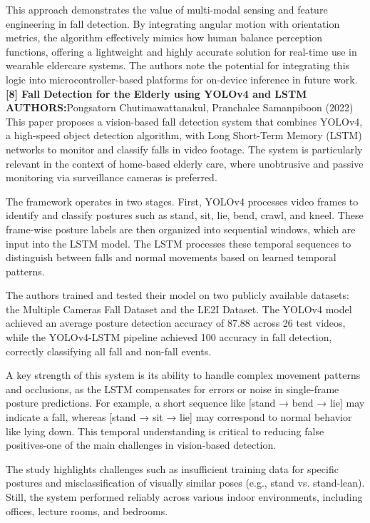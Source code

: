 \documentclass[a4paper, 12pt]{report}
\begin{document}
This approach demonstrates the value of multi-modal sensing and feature engineering in fall detection. By integrating angular motion with orientation metrics, the algorithm effectively mimics how human balance perception functions, offering a lightweight and highly accurate solution for real-time use in wearable eldercare systems. The authors note the potential for integrating this logic into microcontroller-based platforms for on-device inference in future work.\\
\noindent\textbf{[8] Fall Detection for the Elderly using YOLOv4 and LSTM}\\
\textbf{AUTHORS:}Pongsatorn Chutimawattanakul, Pranchalee Samanpiboon (2022)\\
This paper proposes a vision-based fall detection system that combines YOLOv4, a high-speed object detection algorithm, with Long Short-Term Memory (LSTM) networks to monitor and classify falls in video footage. The system is particularly relevant in the context of home-based elderly care, where unobtrusive and passive monitoring via surveillance cameras is preferred.

The framework operates in two stages. First, YOLOv4 processes video frames to identify and classify postures such as stand, sit, lie, bend, crawl, and kneel. These frame-wise posture labels are then organized into sequential windows, which are input into the LSTM model. The LSTM processes these temporal sequences to distinguish between falls and normal movements based on learned temporal patterns.

The authors trained and tested their model on two publicly available datasets: the Multiple Cameras Fall Dataset and the LE2I Dataset. The YOLOv4 model achieved an average posture detection accuracy of 87.88 across 26 test videos, while the YOLOv4-LSTM pipeline achieved 100 accuracy in fall detection, correctly classifying all fall and non-fall events.

A key strength of this system is its ability to handle complex movement patterns and occlusions, as the LSTM compensates for errors or noise in single-frame posture predictions. For example, a short sequence like [stand → bend → lie] may indicate a fall, whereas [stand → sit → lie] may correspond to normal behavior like lying down. This temporal understanding is critical to reducing false positives-one of the main challenges in vision-based detection.

The study highlights challenges such as insufficient training data for specific postures and misclassification of visually similar poses (e.g., stand vs. stand-lean). Still, the system performed reliably across various indoor environments, including offices, lecture rooms, and bedrooms.
\end{document}
